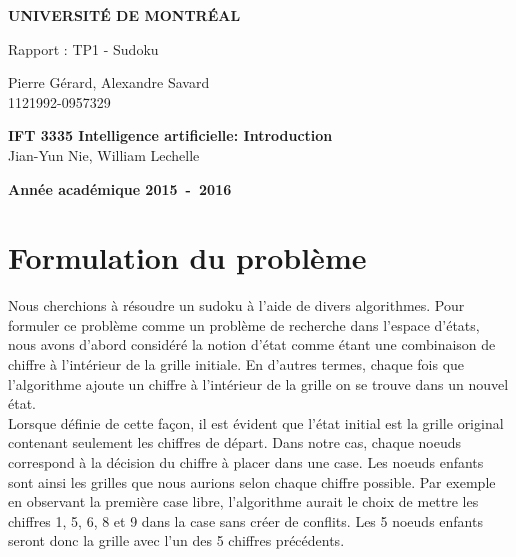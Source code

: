\documentclass[a4paper,10pt]{article}
\begin{document}
\begin{titlepage}
\begin{center}
\textbf{\textsc{UNIVERSIT\'E DE MONTR\'EAL}}\\
\vfill{}\vfill{}
\begin{center}{\Huge Rapport : TP1 - Sudoku}\end{center}{\Huge \par}
\begin{center}{\large Pierre Gérard, Alexandre Savard \\ 1121992-0957329}\end{center}{\Huge \par}
\vfill{}\vfill{} \vfill{}
\begin{flushleft}{\large \textbf{IFT 3335 Intelligence artificielle: Introduction}}\hfill{\\Jian-Yun Nie, William Lechelle}\end{flushleft}{\large\par}
\vfill{}\vfill{}\enlargethispage{3cm}
\textbf{Année académique 2015~-~2016}
\end{center}
\end{titlepage}



\tableofcontents

\pagebreak


\section{Formulation du problème}
Nous cherchions à résoudre un sudoku à l'aide de divers algorithmes. Pour formuler ce problème comme un problème de recherche dans l'espace d'états, nous avons d'abord considéré la notion d'état comme étant une combinaison de chiffre à l'intérieur de la grille initiale. En d'autres termes, chaque fois que l'algorithme ajoute un chiffre à l'intérieur de la grille on se trouve dans un nouvel état. \\

Lorsque définie de cette façon, il est évident que l'état initial est la grille original contenant seulement les chiffres de départ. Dans notre cas, chaque noeuds correspond à la décision du chiffre à placer dans une case. Les noeuds enfants sont ainsi les grilles que nous aurions selon chaque chiffre possible. Par exemple en observant la première case libre, l'algorithme aurait le choix de mettre les chiffres 1, 5, 6, 8 et 9 dans la case sans créer de conflits. Les 5 noeuds enfants seront donc la grille avec l'un des 5 chiffres précédents. \\
\end{document}
